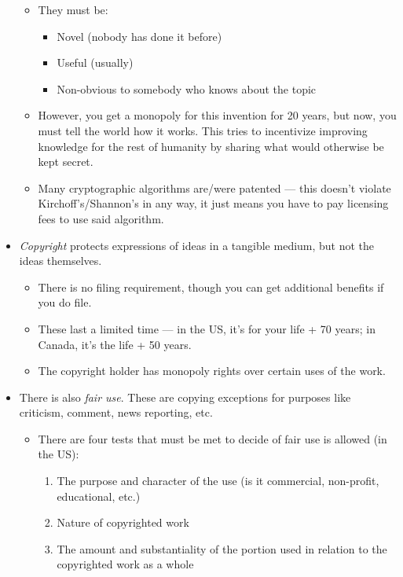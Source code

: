 \documentclass{article}
\begin{document}
\begin{itemize}
\begin{itemize}
            \item They must be:
                \begin{itemize}
                    \item Novel (nobody has done it before)
                    \item Useful (usually)
                    \item Non-obvious to somebody who knows about the topic
                \end{itemize}
            \item However, you get a monopoly for this invention for 20 years, but now, you must tell the world how it works.  This tries to incentivize improving knowledge for the rest of humanity by sharing what would otherwise be kept secret.
            \item Many cryptographic algorithms are/were patented --- this doesn't violate Kirchoff's/Shannon's in any way, it just means you have to pay licensing fees to use said algorithm.
        \end{itemize}
    \item \emph{Copyright} protects expressions of ideas in a tangible medium, but not the ideas themselves.
        \begin{itemize}
            \item There is no filing requirement, though you can get additional benefits if you do file.
            \item These last a limited time --- in the US, it's for your life + 70 years; in Canada, it's the life + 50 years.
            \item The copyright holder has monopoly rights over certain uses of the work.
        \end{itemize}
    \item There is also \emph{fair use}.  These are copying exceptions for purposes like criticism, comment, news reporting, etc.
        \begin{itemize}
            \item There are four tests that must be met to decide of fair use is allowed (in the US):
                \begin{enumerate}
                    \item The purpose and character of the use (is it commercial, non-profit, educational, etc.)
                    \item Nature of copyrighted work
                    \item The amount and substantiality of the portion used in relation to the copyrighted work as a whole

\end{enumerate}
\end{itemize}
\end{itemize}
\end{document}
